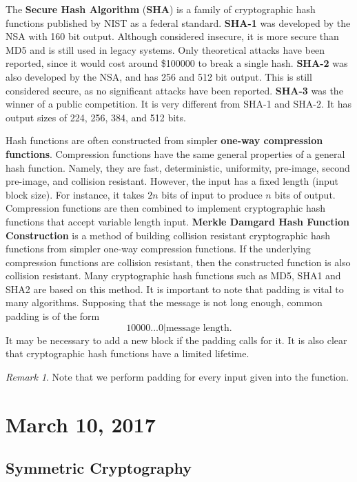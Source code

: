 \documentclass[11pt]{article}
\theoremstyle{plain} %
\theoremstyle{definition}
\theoremstyle{example}
\theoremstyle{remark}
\newtheorem*{remark}{Remark}
\begin{document}
The \textbf{Secure Hash Algorithm} (\textbf{SHA}) is a family of cryptographic hash functions published by NIST as a federal standard. \textbf{SHA-1} was developed by the NSA with 160 bit output. Although considered insecure, it is more secure than MD5 and is still used in legacy systems. Only theoretical attacks have been reported, since it would cost around \$100000 to break a single hash. \textbf{SHA-2} was also developed by the NSA, and has 256 and 512 bit output. This is still considered secure, as no significant attacks have been reported. \textbf{SHA-3} was the winner of a public competition. It is very different from SHA-1 and SHA-2. It has output sizes of 224, 256, 384, and 512 bits. 

Hash functions are often constructed from simpler \textbf{one-way compression functions}. Compression functions have the same general properties of a general hash function. Namely, they are fast, deterministic, uniformity, pre-image, second pre-image, and collision resistant. However, the input has a fixed length (input block size). For instance, it takes $2n$ bits of input to produce $n$ bits of output. Compression functions are then combined to implement cryptographic hash functions that accept variable length input. \textbf{Merkle Damgard Hash Function Construction} is a method of building collision resistant cryptographic hash functions from simpler one-way compression functions. If the underlying compression functions are collision resistant, then the constructed function is also collision resistant. Many cryptographic hash functions such as MD5, SHA1 and SHA2 are based on this method. It is important to note that padding is vital to many algorithms. Supposing that the message is not long enough, common padding is of the form 
$$10000...0|\text{message length}.$$
It may be necessary to add a new block if the padding calls for it. It is also clear that cryptographic hash functions have a limited lifetime. 
\begin{remark}
Note that we perform padding for every input given into the function. 
\end{remark}

\section{March 10, 2017}
\subsection{Symmetric Cryptography}
\end{document}
